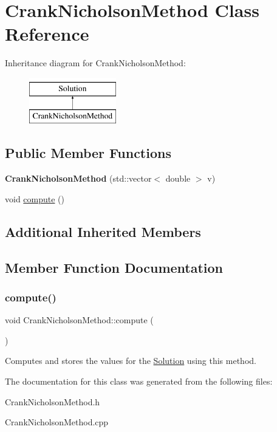 \hypertarget{class_crank_nicholson_method}{}\section{Crank\+Nicholson\+Method Class Reference}
\label{class_crank_nicholson_method}
Inheritance diagram for Crank\+Nicholson\+Method\+:\begin{figure}[H]
\begin{center}
\leavevmode
\includegraphics[height=2.000000cm]{class_crank_nicholson_method}
\end{center}
\end{figure}
\subsection*{Public Member Functions}
\begin{DoxyCompactItemize}
\item 
\mbox{\label{class_crank_nicholson_method_a0bc7a44f5923f75da5fbb1b182f1322e}} 
{\bfseries Crank\+Nicholson\+Method} (std\+::vector$<$ double $>$ v)
\item 
void \hyperlink{class_crank_nicholson_method_a10558e5238673e11a76b4e10e8c588b4}{compute} ()
\end{DoxyCompactItemize}
\subsection*{Additional Inherited Members}


\subsection{Member Function Documentation}
\mbox{\label{class_crank_nicholson_method_a10558e5238673e11a76b4e10e8c588b4}} 
\subsubsection{\texorpdfstring{compute()}{compute()}}
{\footnotesize\ttfamily void Crank\+Nicholson\+Method\+::compute (\begin{DoxyParamCaption}{ }\end{DoxyParamCaption})}

Computes and stores the values for the \hyperlink{class_solution}{Solution} using this method. 

The documentation for this class was generated from the following files\+:\begin{DoxyCompactItemize}
\item 
Crank\+Nicholson\+Method.\+h\item 
Crank\+Nicholson\+Method.\+cpp\end{DoxyCompactItemize}

